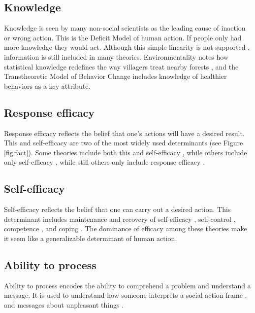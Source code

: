 \documentclass[12 pt]{article}
\begin{document}
		\subsection{Knowledge}
		Knowledge is seen by many non-social scientists as the leading cause of inaction or wrong action. This is the Deficit Model of human action. If people only had more knowledge they would act. Although this simple linearity is not supported \parencite{Sturgis2004}, information is still included in many theories. Environmentality notes how statistical knowledge redefines the way villagers treat nearby forests \parencite{Agrawal2005}, and the Transtheoretic Model of Behavior Change includes knowledge of healthier behaviors as a key attribute. 
		\subsection{Response efficacy}
		Response efficacy reflects the belief that one's actions will have a desired result. This and self-efficacy are two of the most widely used determinants (see Figure \ref{fig:fact}). Some theories include both this and self-efficacy \parencite[e.g., EPPM --][]{Maloney2011}, while others include only self-efficacy \parencite[e.g.,][]{Rimal2001}, while still others only include response efficacy \parencite[e.g.,][]{DeHoog2007}.    
		
		\subsection{Self-efficacy}
		Self-efficacy reflects the belief that one can carry out a desired action. This determinant includes maintenance and recovery of self-efficacy \parencite{Schwarzer2008}, self-control \parencite{Hagger2010}, competence \parencite{Ryan2000}, and coping \parencite{Carraro2013}. The dominance of efficacy among these theories make it seem like a generalizable determinant of human action. 
		
		\subsection{Ability to process}
		Ability to process encodes the ability to comprehend a problem and understand a message. It is used to understand how someone  interprets a social action frame \parencite{Benford2000}, and messages about unpleasant things \parencite{Vastfjall2016}. 
		
\end{document}
